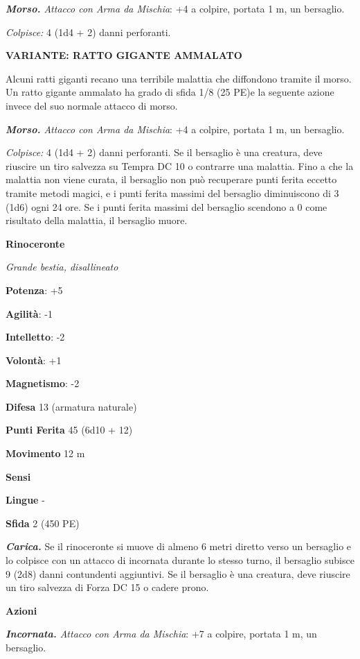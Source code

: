 \begin{multicols}{2}
\emph{\textbf{Morso.} Attacco con Arma da Mischia}: +4 a colpire,
portata 1 m, un bersaglio.

\emph{Colpisce:} 4 (1d4 + 2) danni perforanti.

\textbf{VARIANTE: RATTO GIGANTE AMMALATO}

Alcuni ratti giganti recano una terribile malattia che diffondono
tramite il morso. Un ratto gigante ammalato ha grado di sfida 1/8 (25
PE)\smallskip e la seguente azione invece del suo normale attacco di morso.

\emph{\textbf{Morso.} Attacco con Arma da Mischia}: +4 a colpire,
portata 1 m, un bersaglio.

\emph{Colpisce:} 4 (1d4 + 2) danni perforanti. Se il bersaglio è una
creatura, deve riuscire un tiro salvezza su Tempra DC 10 o
contrarre una malattia. Fino a che la malattia non viene curata, il
bersaglio non può recuperare punti ferita eccetto tramite metodi magici,
e i punti ferita massimi del bersaglio diminuiscono di 3 (1d6) ogni 24
ore. Se i punti ferita massimi del bersaglio scendono a 0 come risultato
della malattia, il bersaglio muore.

\textbf{Rinoceronte}

\emph{Grande bestia, disallineato}

\textbf{Potenza}: +5

\textbf{Agilità}: -1

\textbf{Intelletto}: -2

\textbf{Volontà}: +1

\textbf{Magnetismo}: -2

\textbf{Difesa} 13 (armatura naturale)

\textbf{Punti Ferita} 45 (6d10 + 12)

\textbf{Movimento} 12 m

\textbf{Sensi} 

\textbf{Lingue} -

\textbf{Sfida} 2 (450 PE)\smallskip

\emph{\textbf{Carica.}} Se il rinoceronte si muove di almeno 6 metri
diretto verso un bersaglio e lo colpisce con un attacco di incornata
durante lo stesso turno, il bersaglio subisce 9 (2d8) danni contundenti
aggiuntivi. Se il bersaglio è una creatura, deve riuscire un tiro
salvezza di Forza DC 15 o cadere prono.

\smallskip\textbf{Azioni}

\emph{\textbf{Incornata.} Attacco con Arma da Mischia}: +7 a colpire,
portata 1 m, un bersaglio.


\end{multicols}
